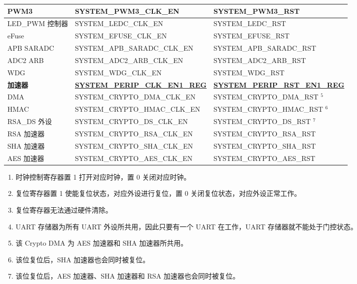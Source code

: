\documentclass[main\_\_CN.tex]{subfiles}
\begin{document}
\begin{longtable}[c]{ |p{4cm}|p{6cm}|p{6cm}| }
PWM3    & SYSTEM\_PWM3\_CLK\_EN & SYSTEM\_PWM3\_RST \\\hline
LED\_PWM 控制器    & SYSTEM\_LEDC\_CLK\_EN & SYSTEM\_LEDC\_RST \\\hline
eFuse    & SYSTEM\_EFUSE\_CLK\_EN & SYSTEM\_EFUSE\_RST \\\hline
APB SARADC    & SYSTEM\_APB\_SARADC\_CLK\_EN & SYSTEM\_APB\_SARADC\_RST \\\hline
ADC2 ARB    & SYSTEM\_ADC2\_ARB\_CLK\_EN & SYSTEM\_ADC2\_ARB\_RST \\\hline
WDG    & SYSTEM\_WDG\_CLK\_EN & SYSTEM\_WDG\_RST \\\hline
\textbf{加速器} & \textbf{\hyperref[regdesc:SYSTEMPERIPCLKEN1REG]{SYSTEM\_PERIP\_CLK\_EN1\_REG}} & \textbf{\hyperref[regdesc:SYSTEMPERIPRSTEN1REG]{SYSTEM\_PERIP\_RST\_EN1\_REG}} \\ \hline
DMA & SYSTEM\_CRYPTO\_DMA\_CLK\_EN & SYSTEM\_CRYPTO\_DMA\_RST {\hyperref[table:reset_notes]{$^5$}}  \\\hline
HMAC & SYSTEM\_CRYPTO\_HMAC\_CLK\_EN & SYSTEM\_CRYPTO\_HMAC\_RST {\hyperref[table:reset_notes]{$^6$}} \\\hline
RSA\_DS 外设 & SYSTEM\_CRYPTO\_DS\_CLK\_EN & SYSTEM\_CRYPTO\_DS\_RST {\hyperref[table:reset_notes]{$^7$}} \\\hline
RSA 加速器 & SYSTEM\_CRYPTO\_RSA\_CLK\_EN & SYSTEM\_CRYPTO\_RSA\_RST \\\hline
SHA 加速器 & SYSTEM\_CRYPTO\_SHA\_CLK\_EN & SYSTEM\_CRYPTO\_SHA\_RST \\\hline
AES 加速器 & SYSTEM\_CRYPTO\_AES\_CLK\_EN & SYSTEM\_CRYPTO\_AES\_RST \\\hline
\end{longtable}


\begin{tiplisting}
\vspace{-3em}\label{table:reset_notes}
\begin{enumerate}
    \item 时钟控制寄存器置 1 打开对应时钟，置 0 关闭对应时钟。
    \item 复位寄存器置 1 使能复位状态，对应外设进行复位，置 0 关闭复位状态，对应外设正常工作。
    \item 复位寄存器无法通过硬件清除。
    \item UART 存储器为所有 UART 外设所共用，因此只要有一个 UART 在工作，UART 存储器就不能处于门控状态。
    \item 该 Crypto DMA 为 AES 加速器和 SHA 加速器所共用。
    \item 该位复位后，SHA 加速器也会同时被复位。
    \item 该位复位后，AES 加速器、SHA 加速器和 RSA 加速器也会同时被复位。
\end{enumerate}
\end{tiplisting}
\end{document}
